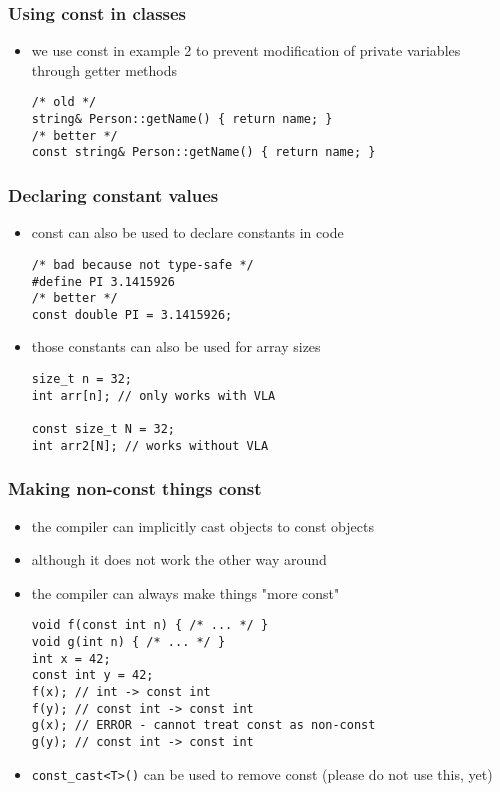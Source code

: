 \begin{frame}[fragile]
    \frametitle{Using const in classes}
    \begin{itemize}
    \item we use const in example 2 to prevent modification of private variables through getter methods
        \begin{lstlisting}[numbers=none]
/* old */
string& Person::getName() { return name; }
/* better */
const string& Person::getName() { return name; }
        \end{lstlisting}
    \end{itemize}
\end{frame}

\begin{frame}[fragile]
    \frametitle{Declaring constant values}
    \begin{itemize}
    \item const can also be used to declare constants in code
    \begin{lstlisting}[numbers=none]
/* bad because not type-safe */
#define PI 3.1415926
/* better */
const double PI = 3.1415926;
    \end{lstlisting}
    \item those constants can also be used for array sizes
    \begin{lstlisting}[numbers=none]
size_t n = 32;
int arr[n]; // only works with VLA

const size_t N = 32;
int arr2[N]; // works without VLA
    \end{lstlisting}
    \end{itemize}
\end{frame}

\begin{frame}[fragile]
    \frametitle{Making non-const things const}
    \begin{itemize}
    \item the compiler can implicitly cast objects to const objects
    \item although it does not work the other way around
    \item the compiler can always make things "more const"
    \begin{lstlisting}[numbers=none]
void f(const int n) { /* ... */ }
void g(int n) { /* ... */ }
int x = 42;
const int y = 42;
f(x); // int -> const int
f(y); // const int -> const int
g(x); // ERROR - cannot treat const as non-const
g(y); // const int -> const int 
    \end{lstlisting}
    \item \lstinline{const_cast<T>()} can be used to remove const (please do not use this, yet)
    \end{itemize}
\end{frame}

